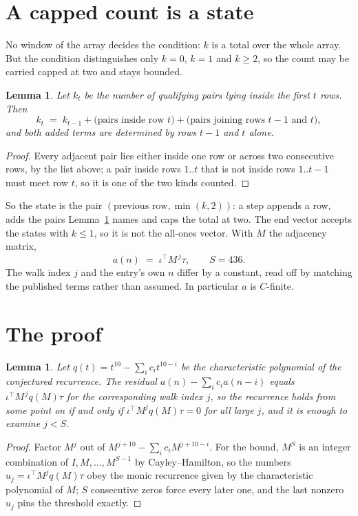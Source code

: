 \documentclass[11pt,a4paper]{article}
\theoremstyle{plain}
\newtheorem{lemma}[theorem]{Lemma}
\theoremstyle{definition}
\begin{document}
\section{A capped count is a state}

No window of the array decides the condition: $k$ is a total over the whole array. But the
condition distinguishes only $k=0$, $k=1$ and $k\ge2$, so the count may be carried capped at
two and stays bounded.

\begin{lemma}\label{lem:cap}
Let $k_t$ be the number of qualifying pairs lying inside the first $t$ rows. Then
\[
k_{t}\;=\;k_{t-1}+\bigl(\text{pairs inside row } t\bigr)
+\bigl(\text{pairs joining rows } t-1 \text{ and } t\bigr),
\]
and both added terms are determined by rows $t-1$ and $t$ alone.
\end{lemma}

\begin{proof}
Every adjacent pair lies either inside one row or across two consecutive rows, by the list
above; a pair inside rows $1..t$ that is not inside rows $1..t-1$ must meet row $t$, so it is
one of the two kinds counted.
\end{proof}

So the state is the pair $(\text{previous row},\min(k,2))$: a step appends a row, adds the
pairs Lemma~\ref{lem:cap} names and caps the total at two. The end vector accepts the states
with $k\le1$, so it is not the all-ones vector. With $M$ the adjacency matrix,
\[
a(n)\;=\;\iota^{\!\top}M^{\,j}\tau ,\qquad S=436.
\]
The walk index $j$ and the entry's own $n$ differ by a constant, read off by matching the
published terms rather than assumed. In particular $a$ is $C$-finite.

\section{The proof}

\begin{lemma}\label{lem:crit}
Let $q(t)=t^{10}-\sum_i c_it^{10-i}$ be the characteristic polynomial of the
conjectured recurrence. The residual $a(n)-\sum_ic_ia(n-i)$ equals
$\iota^{\!\top}M^{\,j}q(M)\tau$ for the corresponding walk index $j$, so the recurrence
holds from some point on if and only if $\iota^{\!\top}M^{j}q(M)\tau=0$ for all large $j$,
and it is enough to examine $j<S$.
\end{lemma}

\begin{proof}
Factor $M^{j}$ out of $M^{j+10}-\sum_ic_iM^{j+10-i}$. For the bound, $M^{S}$
is an integer combination of $I,M,\dots,M^{S-1}$ by Cayley--Hamilton, so the numbers
$u_j=\iota^{\!\top}M^{j}q(M)\tau$ obey the monic recurrence given by the characteristic
polynomial of $M$; $S$ consecutive zeros force every later one, and the last nonzero $u_j$
pins the threshold exactly.
\end{proof}
\end{document}
